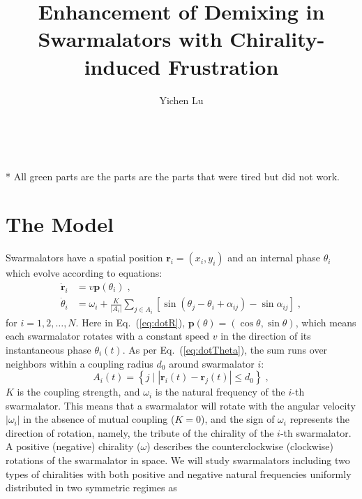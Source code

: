 \documentclass{article}
\title{\textbf{Enhancement of Demixing in Swarmalators with Chirality-induced Frustration}}
\author{Yichen Lu}
\begin{document}
\maketitle

\tableofcontents

\ \newline
\color{darkGreen}
    
    * All green parts are the parts are the parts that were tired but did not work.
\color{black}

\section{\label{sec:model}The Model}

Swarmalators have a spatial position $\mathbf{r}_i=\left( x_i, y_i \right)$ and an internal phase $\theta_i$ which evolve according to equations:
\begin{subequations} 
    \label{eq:totalDynamicsMeanField}
    \begin{align}
        \dot{\mathbf{r}}_i&=v\mathbf{p}\left( \theta _i \right)\;\label{eq:dotR},
        \\
        \dot{\theta}_i&=\omega _i+\frac{K}{\left| A_i \right|}\sum_{j\in A_i}{\left[ \sin \left( \theta _j-\theta _i+\alpha _{ij} \right) -\sin \alpha _{ij} \right]}\;\label{eq:dotTheta},
    \end{align}
\end{subequations}
for $i=1,2,\ldots,N$. Here in Eq.~(\ref{eq:dotR}), $\mathbf{p}\left( \theta \right) =\left( \cos \theta ,\sin \theta \right)$, which means each swarmalator rotates with a constant speed $v$ in the direction of its instantaneous phase $\theta_i (t)$. As per Eq.~(\ref{eq:dotTheta}), the sum runs over neighbors within a coupling radius $d_0$ around swarmalator $i$:
\begin{equation}
    A_i\left( t \right) =\left\{ j\mid \left| \mathbf{r}_i\left( t \right) -\mathbf{r}_j\left( t \right) \right|\leqslant d_0 \right\} \;,
\end{equation}
$K$ is the coupling strength, and $\omega_i$ is the natural frequency of the $i$-th swarmalator. 
This means that a swarmalator will rotate with the angular velocity $|\omega_i |$ in the absence of mutual coupling ($K=0$), and the sign of $\omega_i$ represents the direction of rotation, namely, the tribute of the chirality of the $i$-th swarmalator. A positive (negative) chirality ($\omega$) describes the counterclockwise (clockwise) rotations of the swarmalator in space. 
We will study swarmalators including two types of chiralities with both positive and negative natural frequencies uniformly distributed in two symmetric regimes as 
\end{document}
